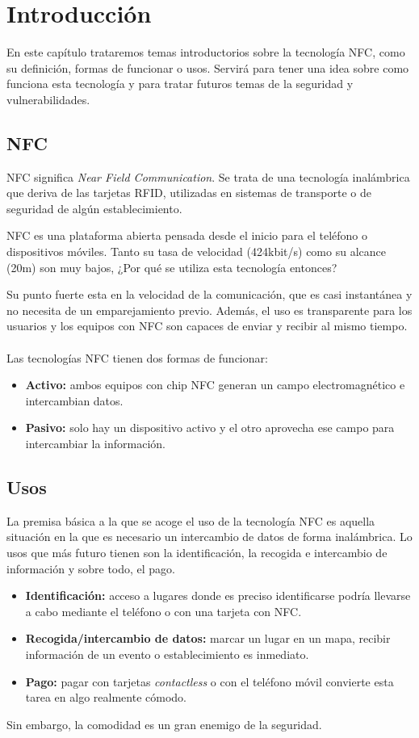 \chapter{Introducción}\label{ch:introduction}
En este capítulo trataremos temas introductorios sobre la tecnología NFC, como su definición, formas de funcionar o usos. Servirá para tener una idea sobre como funciona esta tecnología y para tratar futuros temas de la seguridad y vulnerabilidades.
\clearpage
\section{NFC}
NFC significa \textit{Near Field Communication}. Se trata de una tecnología inalámbrica que deriva de las tarjetas RFID, utilizadas en sistemas de transporte o de seguridad de algún establecimiento.\par
NFC es una plataforma abierta pensada desde el inicio para el teléfono o dispositivos móviles. Tanto su tasa de velocidad (424kbit/s) como su alcance (20m) son muy bajos, ¿Por qué se utiliza esta tecnología entonces?\par
Su punto fuerte esta en la velocidad de la comunicación, que es casi instantánea y no necesita de un emparejamiento previo. Además, el uso es transparente para los usuarios y los equipos con NFC son capaces de enviar y recibir al mismo tiempo.\\\\
Las tecnologías NFC tienen dos formas de funcionar:
\begin{itemize}
	\item \textbf{Activo:} ambos equipos con chip NFC generan un campo electromagnético e intercambian datos.
	\item \textbf{Pasivo:} solo hay un dispositivo activo y el otro aprovecha ese campo para intercambiar la información.
\end{itemize}
\section{Usos}
La premisa básica a la que se acoge el uso de la tecnología NFC es aquella situación en la que es necesario un intercambio de datos de forma inalámbrica. Lo usos que más futuro tienen son la identificación, la recogida e intercambio de información y sobre todo, el pago.
\begin{itemize}
	\item \textbf{Identificación:} acceso a lugares donde es preciso identificarse podría llevarse a cabo mediante el teléfono o con una tarjeta con NFC.
	\item \textbf{Recogida/intercambio de datos:} marcar un lugar en un mapa, recibir información de un evento o establecimiento es inmediato.
	\item \textbf{Pago:} pagar con tarjetas \textit{contactless} o con el teléfono móvil convierte esta tarea en algo realmente cómodo.
\end{itemize}
Sin embargo, la comodidad es un gran enemigo de la seguridad.

